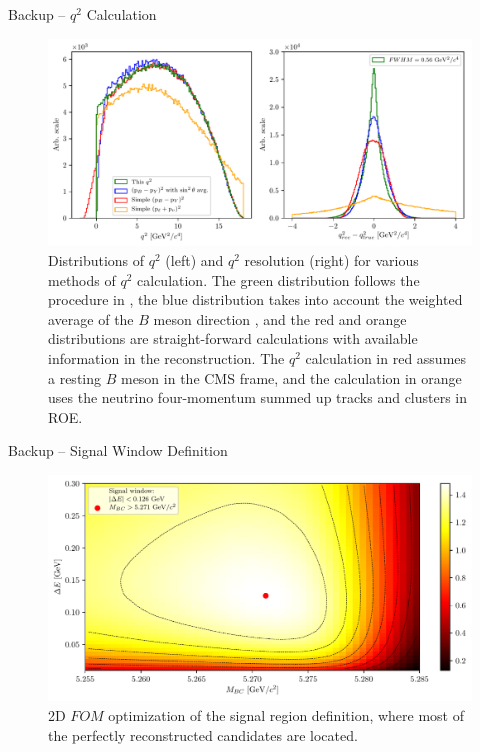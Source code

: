 \documentclass[serif]{beamer}
\begin{document}
\begin{frame}[t]{Backup -- $q^2$ Calculation}
\vspace{-3mm}
\small
\begin{figure}[H]
	\centering
	\includegraphics[width=0.8\linewidth]{fig/q2}
	\caption{Distributions of $q^2$ (left) and $q^2$ resolution (right) for various methods of $q^2$ calculation. The green distribution follows the procedure in \cite{VubCLEO}, the blue distribution takes into account the weighted average of the $B$ meson direction \cite{Ha:2010rf}, and the red and orange distributions are straight-forward calculations with available information in the reconstruction. The $q^2$ calculation in red assumes a resting $B$ meson in the CMS frame, and the calculation in orange uses the neutrino four-momentum summed up tracks and clusters in ROE.}
\end{figure}
\end{frame}

\begin{frame}[t]{Backup -- Signal Window Definition}
\vspace{-3mm}
\small
\begin{figure}[H]
	\centering
	\includegraphics[width=\linewidth]{fig/sigWin}
	\caption{2D $FOM$ optimization of the signal region definition, where most of the perfectly reconstructed candidates are located.}
\end{figure}
\end{frame}
\end{document}
